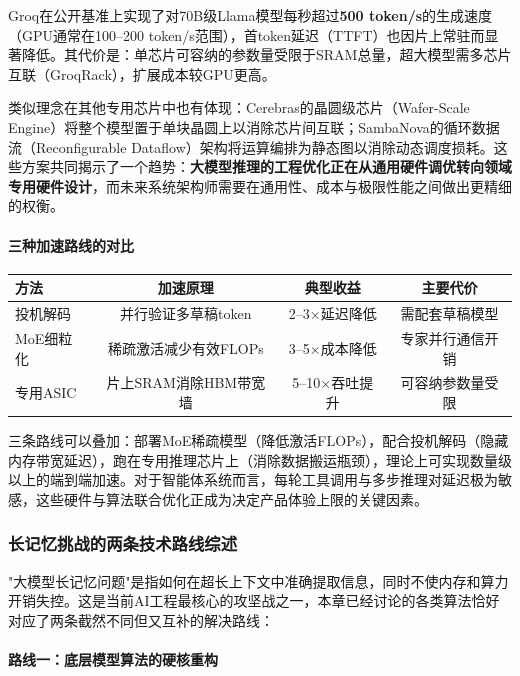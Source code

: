 \documentclass[12pt,a4paper]{article}
\begin{document}
Groq在公开基准上实现了对70B级Llama模型每秒超过\textbf{500 token/s}的生成速度（GPU通常在100--200 token/s范围），首token延迟（TTFT）也因片上常驻而显著降低。其代价是：单芯片可容纳的参数量受限于SRAM总量，超大模型需多芯片互联（GroqRack），扩展成本较GPU更高。

类似理念在其他专用芯片中也有体现：Cerebras的晶圆级芯片（Wafer-Scale Engine）将整个模型置于单块晶圆上以消除芯片间互联；SambaNova的循环数据流（Reconfigurable Dataflow）架构将运算编排为静态图以消除动态调度损耗。这些方案共同揭示了一个趋势：\textbf{大模型推理的工程优化正在从通用硬件调优转向领域专用硬件设计}，而未来系统架构师需要在通用性、成本与极限性能之间做出更精细的权衡。

\paragraph{三种加速路线的对比}

\begin{center}
\begin{tabular}{lccc}
\hline
\textbf{方法} & \textbf{加速原理} & \textbf{典型收益} & \textbf{主要代价} \\
\hline
投机解码 & 并行验证多草稿token & 2--3$\times$延迟降低 & 需配套草稿模型 \\
MoE细粒化 & 稀疏激活减少有效FLOPs & 3--5$\times$成本降低 & 专家并行通信开销 \\
专用ASIC & 片上SRAM消除HBM带宽墙 & 5--10$\times$吞吐提升 & 可容纳参数量受限 \\
\hline
\end{tabular}
\end{center}

三条路线可以叠加：部署MoE稀疏模型（降低激活FLOPs），配合投机解码（隐藏内存带宽延迟），跑在专用推理芯片上（消除数据搬运瓶颈），理论上可实现数量级以上的端到端加速。对于智能体系统而言，每轮工具调用与多步推理对延迟极为敏感，这些硬件与算法联合优化正成为决定产品体验上限的关键因素。

\subsubsection{长记忆挑战的两条技术路线综述}

"大模型长记忆问题"是指如何在超长上下文中准确提取信息，同时不使内存和算力开销失控。这是当前AI工程最核心的攻坚战之一，本章已经讨论的各类算法恰好对应了两条截然不同但又互补的解决路线：

\paragraph{路线一：底层模型算法的硬核重构}
\end{document}
